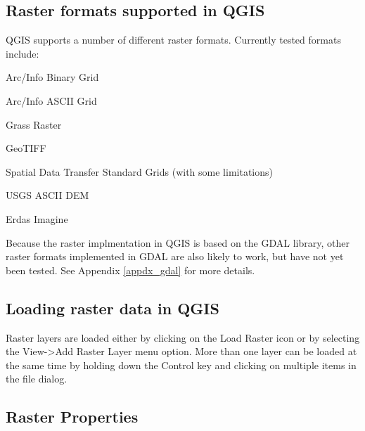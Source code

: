 \documentclass[10pt,english]{article}
\begin{document}
\begin{onehalfspace}
\subsection{Raster formats supported in QGIS}
QGIS supports a number of different raster formats. Currently tested formats include:
\begin{compactitem}
\item Arc/Info Binary Grid
\item  Arc/Info ASCII Grid
\item Grass Raster
\item GeoTIFF
\item Spatial Data Transfer Standard Grids (with some limitations)
\item USGS ASCII DEM
\item Erdas Imagine
\end{compactitem}
Because the raster implmentation in QGIS is based on the GDAL library, other raster formats implemented in GDAL are also likely to work, but have not yet been tested. See Appendix \ref{appdx_gdal} for more details.
	
\subsection{Loading raster data in QGIS}
Raster layers are loaded either by clicking on the Load Raster icon or by selecting the View->Add Raster Layer menu option. More than one layer can be loaded at the same time by holding down the Control key and clicking on multiple items in the file dialog.\\
	
\subsection{Raster Properties}


\end{onehalfspace}
\end{document}
